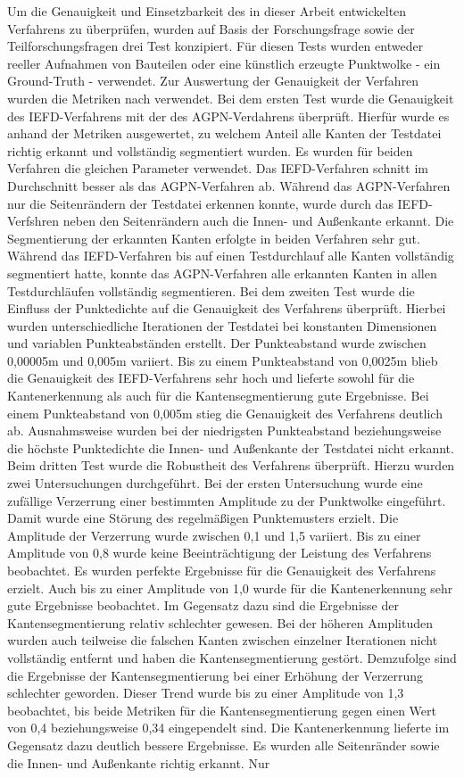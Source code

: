 Um die Genauigkeit und Einsetzbarkeit des in dieser Arbeit entwickelten Verfahrens zu überprüfen, wurden auf Basis der Forschungsfrage sowie der Teilforschungsfragen drei Test konzipiert. Für diesen Tests wurden entweder reeller Aufnahmen von Bauteilen oder eine künstlich erzeugte Punktwolke - ein Ground-Truth - verwendet. Zur Auswertung der Genauigkeit der Verfahren wurden die Metriken nach \autocite[13]{ni_edge_2016} verwendet. Bei dem ersten Test wurde die Genauigkeit des IEFD-Verfahrens mit der des AGPN-Verdahrens überprüft. Hierfür wurde es anhand der Metriken ausgewertet, zu welchem Anteil alle Kanten der Testdatei richtig erkannt und vollständig segmentiert wurden. Es wurden für beiden Verfahren die gleichen Parameter verwendet. Das IEFD-Verfahren schnitt im Durchschnitt besser als das AGPN-Verfahren ab. Während das AGPN-Verfahren nur die Seitenrändern der Testdatei erkennen konnte, wurde durch das IEFD-Verfshren neben den Seitenrändern auch die Innen- und Außenkante erkannt. Die Segmentierung der erkannten Kanten erfolgte in beiden Verfahren sehr gut. Während das IEFD-Verfahren bis auf einen Testdurchlauf alle Kanten vollständig segmentiert hatte, konnte das AGPN-Verfahren alle erkannten Kanten in allen Testdurchläufen vollständig segmentieren. Bei dem zweiten Test wurde die Einfluss der Punktedichte auf die Genauigkeit des Verfahrens überprüft. Hierbei wurden unterschiedliche Iterationen der Testdatei bei konstanten Dimensionen und variablen Punkteabständen erstellt. Der Punkteabstand wurde zwischen 0,00005m und 0,005m variiert. Bis zu einem Punkteabstand von 0,0025m blieb die Genauigkeit des IEFD-Verfahrens sehr hoch und lieferte sowohl für die Kantenerkennung als auch für die Kantensegmentierung gute Ergebnisse. Bei einem Punkteabstand von 0,005m stieg die Genauigkeit des Verfahrens deutlich ab. Ausnahmsweise wurden bei der niedrigsten Punkteabstand beziehungsweise die höchste Punktedichte die Innen- und Außenkante der Testdatei nicht erkannt. Beim dritten Test wurde die Robustheit des Verfahrens überprüft. Hierzu wurden zwei Untersuchungen durchgeführt. Bei der ersten Untersuchung wurde eine zufällige Verzerrung einer bestimmten Amplitude zu der Punktwolke eingeführt. Damit wurde eine Störung des regelmäßigen Punktemusters erzielt. Die Amplitude der Verzerrung wurde zwischen 0,1 und 1,5 variiert. Bis zu einer Amplitude von 0,8 wurde keine Beeinträchtigung der Leistung des Verfahrens beobachtet. Es wurden perfekte Ergebnisse für die Genauigkeit des Verfahrens erzielt. Auch bis zu einer Amplitude von 1,0 wurde für die Kantenerkennung sehr gute Ergebnisse beobachtet. Im Gegensatz dazu sind die Ergebnisse der Kantensegmentierung relativ schlechter gewesen. Bei der höheren Amplituden wurden auch teilweise die falschen Kanten zwischen einzelner Iterationen nicht vollständig entfernt und haben die Kantensegmentierung gestört. Demzufolge sind die Ergebnisse der Kantensegmentierung bei einer Erhöhung der Verzerrung schlechter geworden. Dieser Trend wurde bis zu einer Amplitude von 1,3 beobachtet, bis beide Metriken für die Kantensegmentierung gegen einen Wert von 0,4 beziehungsweise 0,34 eingependelt sind. Die Kantenerkennung lieferte im Gegensatz dazu deutlich bessere Ergebnisse. Es wurden alle Seitenränder sowie die Innen- und Außenkante richtig erkannt.
Nur 


